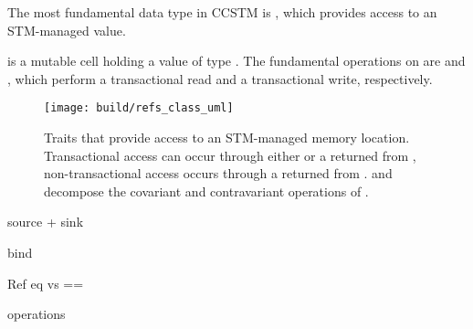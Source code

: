 The most fundamental data type in CCSTM is , which provides
access to an STM-managed value.

is a
mutable cell holding a value of type .  The fundamental
operations on  are  and , which perform
a transactional read and a transactional write, respectively.

\begin{figure*}
  \centering
  \texttt{[image: build/refs\_class\_uml]}

\caption{Traits that provide access to an STM-managed memory
location.  Transactional access can occur through either 
or a  returned from ,
non-transactional access occurs through a  returned
from .   and 
decompose the covariant and contravariant operations of .}

\label{fig:refsclasses}
\end{figure*}

source + sink

bind

Ref eq vs ==

operations
